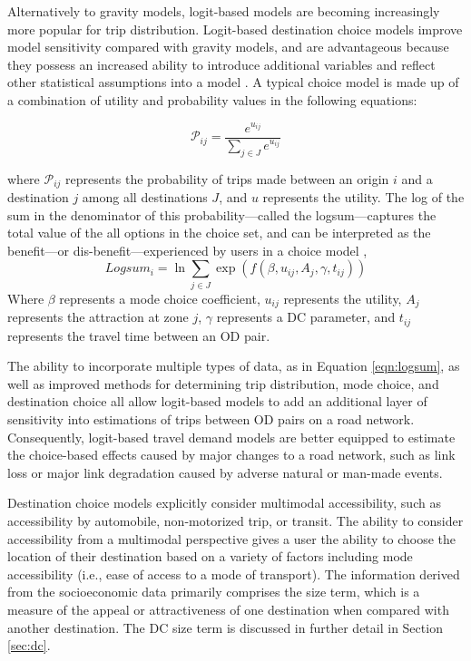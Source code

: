 Alternatively to gravity models, logit-based models are becoming
increasingly more popular for trip distribution. Logit-based destination choice models improve model
sensitivity compared with gravity models, and are advantageous because
they possess an increased ability to introduce additional variables and reflect
other statistical assumptions into a model \citep{tfr2021}. A typical choice
model is made up of a combination of utility and probability values in the
following equations:

\begin{equation}
\mathcal{P}_{ij} = \frac{e^{u_{ij}}}{\sum_{j\in J}e^{u_{ij}}}
  \label{eqn:probability}
\end{equation}

\noindent where $\mathcal{P}_{ij}$ represents the probability of trips made between an
origin \(i\) and a destination \(j\) among all destinations $J$, and \(u\) represents the utility.
The log of the sum in the denominator of this probability---called the logsum---captures the total value of the all options in the choice set, and can be interpreted as the
benefit---or dis-benefit---experienced by users in a choice model \citep{williams1974},
\begin{equation}
 Logsum_{i} = \ln\sum_{j\in J}\exp(f(\beta, u_{ij}, A_j, \gamma, t_{ij}))
  \label{eqn:logsum}
\end{equation}
Where $\beta$ represents a mode choice coefficient, $u_{ij}$ represents the utility,
$A_j$ represents the attraction at zone $j$, $\gamma$ represents
a DC parameter, and $t_{ij}$ represents the travel time between an OD pair.

The ability to incorporate multiple types of data, as in Equation \ref{eqn:logsum}, as well as improved methods
for determining trip distribution, mode choice, and destination choice all allow
logit-based models to add an additional layer of sensitivity into estimations of
trips between OD pairs on a road network. Consequently, logit-based travel
demand models are better equipped to estimate the choice-based effects caused
by major changes to a road network, such as link loss or major link degradation
caused by adverse natural or man-made events.

Destination choice models explicitly consider multimodal accessibility, such as accessibility by automobile,
non-motorized trip, or transit. The ability to consider accessibility from a
multimodal perspective gives a user the ability to choose the location of
their destination based on a variety of factors including mode accessibility
(i.e., ease of access to a mode of transport). The information
derived from the socioeconomic data primarily comprises the size term, which
is a measure of the appeal or attractiveness of one destination when compared with
another destination. The DC size term is discussed in further detail in
Section \ref{sec:dc}.


